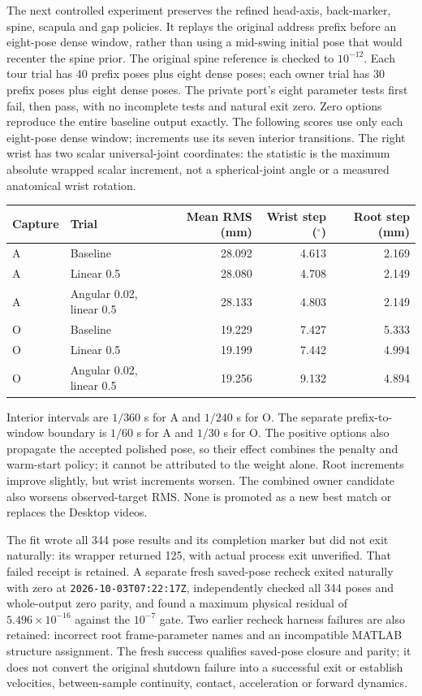 \documentclass[11pt,a4paper]{article}
\begin{document}
The next controlled experiment preserves the refined head-axis, back-marker,
spine, scapula and gap policies. It replays the original address prefix before
an eight-pose dense window, rather than using a mid-swing initial pose that
would recenter the spine prior. The original spine reference is checked to
$10^{-12}$. Each tour trial has 40 prefix poses plus eight dense poses; each
owner trial has 30 prefix poses plus eight dense poses. The private port's
eight parameter tests first fail, then pass, with no incomplete tests and
natural exit zero. Zero options reproduce the entire baseline output exactly.
The following scores use only each eight-pose dense window; increments use
its seven interior transitions. The right wrist has two scalar universal-joint
coordinates: the statistic is the maximum absolute wrapped scalar increment,
not a spherical-joint angle or a measured anatomical wrist rotation.
\begin{center}
\begin{tabular}{llrrr}
\hline
Capture & Trial & Mean RMS (mm) & Wrist step ($^{\circ}$) & Root step (mm)\\
\hline
A & Baseline & 28.092 & 4.613 & 2.169\\
A & Linear 0.5 & 28.080 & 4.708 & 2.149\\
A & Angular 0.02, linear 0.5 & 28.133 & 4.803 & 2.149\\
O & Baseline & 19.229 & 7.427 & 5.333\\
O & Linear 0.5 & 19.199 & 7.442 & 4.994\\
O & Angular 0.02, linear 0.5 & 19.256 & 9.132 & 4.894\\
\hline
\end{tabular}
\end{center}
Interior intervals are $1/360$ s for A and $1/240$ s for O. The separate
prefix-to-window boundary is $1/60$ s for A and $1/30$ s for O. The positive
options also propagate the accepted polished pose, so their effect combines
the penalty and warm-start policy; it cannot be attributed to the weight
alone. Root increments improve slightly, but wrist increments worsen. The
combined owner candidate also worsens observed-target RMS. None is promoted
as a new best match or replaces the Desktop videos.

The fit wrote all 344 pose results and its completion marker but did not exit
naturally: its wrapper returned 125, with actual process exit unverified.
That failed receipt is retained. A separate fresh saved-pose recheck exited
naturally with zero at \texttt{2026-10-03T07:22:17Z}, independently checked all
344 poses and whole-output zero parity, and found a maximum physical residual
of $5.496\times10^{-16}$ against the $10^{-7}$ gate. Two earlier recheck
harness failures are also retained: incorrect root frame-parameter names and
an incompatible MATLAB structure assignment. The fresh success qualifies
saved-pose closure and parity; it does not convert the original shutdown
failure into a successful exit or establish velocities, between-sample
continuity, contact, acceleration or forward dynamics.
\end{document}
